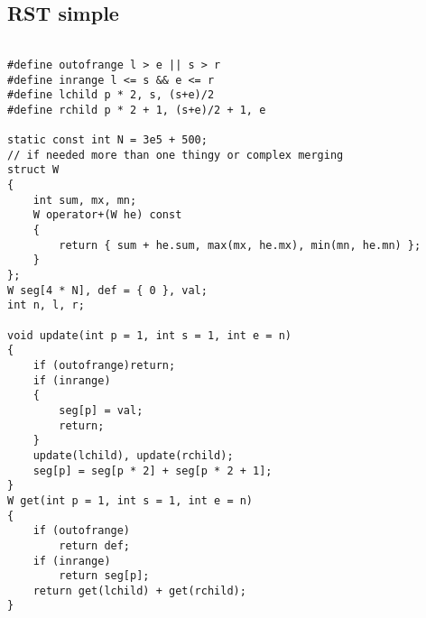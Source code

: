 \documentclass{article}
\begin{document}
\subsection{RST simple}
\begin{verbatim}

#define outofrange l > e || s > r
#define inrange l <= s && e <= r
#define lchild p * 2, s, (s+e)/2
#define rchild p * 2 + 1, (s+e)/2 + 1, e

static const int N = 3e5 + 500;
// if needed more than one thingy or complex merging
struct W
{
	int sum, mx, mn;
	W operator+(W he) const
	{
		return { sum + he.sum, max(mx, he.mx), min(mn, he.mn) };
	}
};
W seg[4 * N], def = { 0 }, val;
int n, l, r;

void update(int p = 1, int s = 1, int e = n)
{
	if (outofrange)return;
	if (inrange)
	{
		seg[p] = val;
		return;
	}
	update(lchild), update(rchild);
	seg[p] = seg[p * 2] + seg[p * 2 + 1];
}
W get(int p = 1, int s = 1, int e = n)
{
	if (outofrange)
		return def;
	if (inrange)
		return seg[p];
	return get(lchild) + get(rchild);
}

\end{verbatim}
\end{document}
